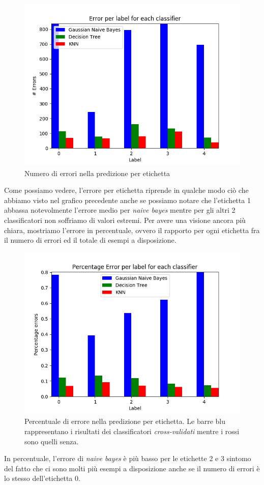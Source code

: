 \begin{figure}[H]
	\centering
	\includegraphics[width=0.7\linewidth]{img/test_error_per_label}
	\caption{Numero di errori nella predizione per etichetta}
	\label{fig:testerrorperlabel}
\end{figure}
Come possiamo vedere, l'errore per etichetta riprende in qualche modo ci\`o che abbiamo visto nel grafico precedente anche se possiamo notare che l'etichetta 1 abbassa notevolmente l'errore medio per \textit{naive bayes} mentre per gli altri 2 classificatori non soffriamo di valori estremi.
Per avere una visione ancora pi\`u chiara, mostriamo l'errore in percentuale, ovvero il rapporto per ogni etichetta fra il numero di errori ed il totale di esempi a disposizione.
\medskip
\begin{figure}[H]
	\centering
	\includegraphics[width=0.7\linewidth]{img/percentage_test_errors_per_label}
	\caption{Percentuale di errore nella predizione per etichetta. Le barre blu rappresentano i risultati dei classificatori \textit{cross-validati} mentre i rossi sono quelli senza.}
	\label{fig:percentagetesterrorsperlabel}
\end{figure}

In percentuale, l'errore di \textit{naive bayes} \`e pi\`u basso per le etichette 2 e 3 sintomo del fatto che ci sono molti pi\`u esempi a disposizione anche se il numero di errori \`e lo stesso dell'etichetta 0.

